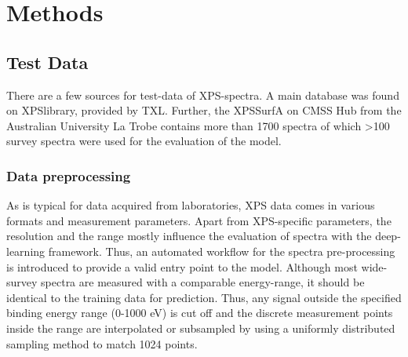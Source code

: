


\chapter{Methods} %

\label{Chapter3} %




\section{Test Data}

There are a few sources for test-data of XPS-spectra. A main database was found on XPSlibrary, provided by TXL. Further, the XPSSurfA on CMSS Hub from the Australian University La Trobe contains more than 1700 spectra of which >100 survey spectra were used for the evaluation of the model.


\subsection{Data preprocessing}

As is typical for data acquired from laboratories, XPS data comes in various formats and measurement parameters. Apart from XPS-specific parameters, the resolution and the range mostly influence the evaluation of spectra with the deep-learning framework. Thus, an automated workflow for the spectra pre-processing is introduced to provide a valid entry point to the model.
Although most wide-survey spectra are measured with a comparable energy-range, it should be identical to the training data for prediction. Thus, any signal outside the specified binding energy range (0-1000 eV) is cut off and the discrete measurement points inside the range are interpolated or subsampled by using a uniformly distributed sampling method to match 1024 points.

